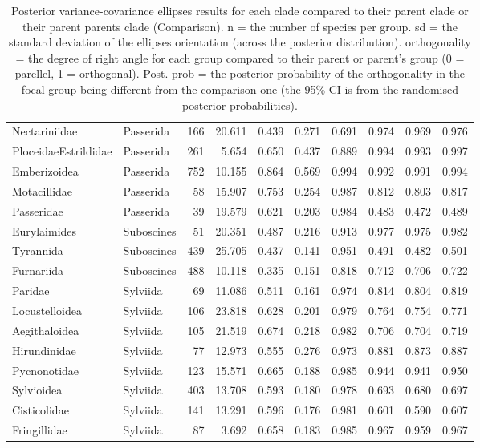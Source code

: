 \begin{table}[ht]
\begin{tabular}{llrrrrrrrr}
  Nectariniidae & Passerida &  166 & 20.611 & 0.439 & 0.271 & 0.691 & 0.974 & 0.969 & 0.976 \\ 
  PloceidaeEstrildidae & Passerida &  261 & 5.654 & 0.650 & 0.437 & 0.889 & 0.994 & 0.993 & 0.997 \\ 
  Emberizoidea & Passerida &  752 & 10.155 & 0.864 & 0.569 & 0.994 & 0.992 & 0.991 & 0.994 \\ 
  Motacillidae & Passerida &   58 & 15.907 & 0.753 & 0.254 & 0.987 & 0.812 & 0.803 & 0.817 \\ 
  Passeridae & Passerida &   39 & 19.579 & 0.621 & 0.203 & 0.984 & 0.483 & 0.472 & 0.489 \\ 
  Eurylaimides & Suboscines &   51 & 20.351 & 0.487 & 0.216 & 0.913 & 0.977 & 0.975 & 0.982 \\ 
  Tyrannida & Suboscines &  439 & 25.705 & 0.437 & 0.141 & 0.951 & 0.491 & 0.482 & 0.501 \\ 
  Furnariida & Suboscines &  488 & 10.118 & 0.335 & 0.151 & 0.818 & 0.712 & 0.706 & 0.722 \\ 
  Paridae & Sylviida &   69 & 11.086 & 0.511 & 0.161 & 0.974 & 0.814 & 0.804 & 0.819 \\ 
  Locustelloidea & Sylviida &  106 & 23.818 & 0.628 & 0.201 & 0.979 & 0.764 & 0.754 & 0.771 \\ 
  Aegithaloidea & Sylviida &  105 & 21.519 & 0.674 & 0.218 & 0.982 & 0.706 & 0.704 & 0.719 \\ 
  Hirundinidae & Sylviida &   77 & 12.973 & 0.555 & 0.276 & 0.973 & 0.881 & 0.873 & 0.887 \\ 
  Pycnonotidae & Sylviida &  123 & 15.571 & 0.665 & 0.188 & 0.985 & 0.944 & 0.941 & 0.950 \\ 
  Sylvioidea & Sylviida &  403 & 13.708 & 0.593 & 0.180 & 0.978 & 0.693 & 0.680 & 0.697 \\ 
  Cisticolidae & Sylviida &  141 & 13.291 & 0.596 & 0.176 & 0.981 & 0.601 & 0.590 & 0.607 \\ 
  Fringillidae & Sylviida &   87 & 3.692 & 0.658 & 0.183 & 0.985 & 0.967 & 0.959 & 0.967 \\ 
   \hline
\end{tabular}
\caption{Posterior variance-covariance ellipses results for each clade compared to their parent clade or their parent parents clade (Comparison). n = the number of species per group. sd = the standard deviation of the ellipses orientation (across the posterior distribution). orthogonality = the degree of right angle for each group compared to their parent or parent's group (0 = parellel, 1 = orthogonal). Post. prob = the posterior probability of the orthogonality in the focal group being different from the comparison one (the 95\% CI is from the randomised posterior probabilities).} 
\label{tab_ortho_results}
\end{table}
